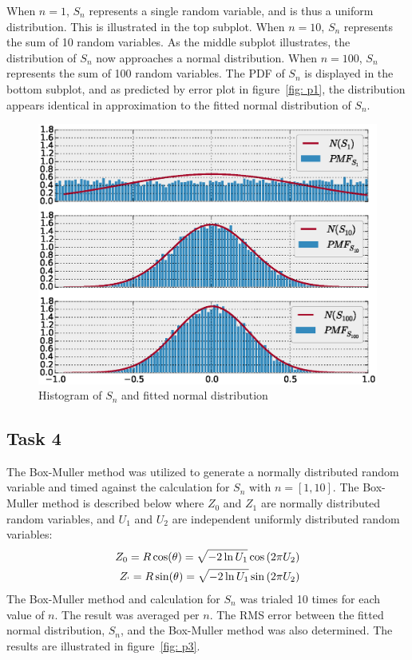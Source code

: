 When $n = 1$,  $S_n$ represents a single random variable, and is thus a uniform distribution. This is illustrated in the top subplot. When $n=10$, $S_n$ represents the sum of 10 random variables. As the middle subplot illustrates, the distribution of $S_n$ now approaches a normal distribution. When $n=100$, $S_n$ represents the sum of 100 random variables. The PDF of $S_n$ is displayed in the bottom subplot, and as predicted by error plot in figure~\ref{fig: p1}, the distribution appears identical in approximation to the fitted normal distribution of $S_n$. 

\begin{figure}[H] 
	\centering 
	\includegraphics[width=\linewidth]{figure_2}
	\caption{Histogram of $S_n$ and fitted normal distribution}
	\label{fig: p2} 
\end{figure}

\subsection{Task 4} 
The Box-Muller method was utilized to generate a normally distributed random variable and timed against the calculation for $S_n$ with $n = [1,10]$. The Box-Muller method is described below where $Z_0$ and $Z_1$ are normally distributed random variables, and $U_1$ and $U_2$ are independent uniformly distributed random variables: 
\begin{eqnarray}
Z_0 = R\cos(\theta) = \sqrt{-2\ln{U_1}}\cos{(2\pi U_2)} \\
Z_` = R\sin(\theta) = \sqrt{-2\ln{U_1}}\sin{(2\pi U_2)}
\end{eqnarray}
The Box-Muller method and calculation for $S_n$ was trialed 10 times for each value of $n$. The result was averaged per $n$. The RMS error between the fitted normal distribution, $S_n$, and the Box-Muller method was also determined. The results are illustrated in figure~\ref{fig: p3}. \\ 


